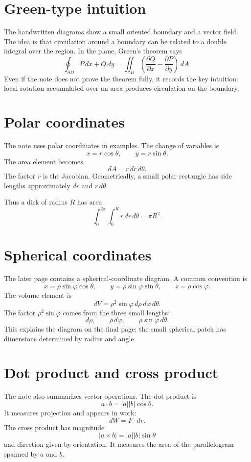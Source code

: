 \section{Green-type intuition}

The handwritten diagrams show a small oriented boundary and a vector field.  The idea is that circulation around a boundary can be related to a double integral over the region.  In the plane, Green's theorem says
\[
  \oint_{\partial D} P\,dx+Q\,dy
  =
  \iint_D \left(\frac{\partial Q}{\partial x}-\frac{\partial P}{\partial y}\right)\,dA.
\]
Even if the note does not prove the theorem fully, it records the key intuition: local rotation accumulated over an area produces circulation on the boundary.

\section{Polar coordinates}

The note uses polar coordinates in examples.  The change of variables is
\[
  x=r\cos\theta,\qquad y=r\sin\theta.
\]
The area element becomes
\[
  dA=r\,dr\,d\theta.
\]
The factor $r$ is the Jacobian.  Geometrically, a small polar rectangle has side lengths approximately $dr$ and $r\,d\theta$.

Thus a disk of radius $R$ has area
\[
  \int_0^{2\pi}\int_0^R r\,dr\,d\theta=\pi R^2.
\]

\section{Spherical coordinates}

The later page contains a spherical-coordinate diagram.  A common convention is
\[
  x=\rho\sin\varphi\cos\theta,\qquad
  y=\rho\sin\varphi\sin\theta,\qquad
  z=\rho\cos\varphi.
\]
The volume element is
\[
  dV=\rho^2\sin\varphi\,d\rho\,d\varphi\,d\theta.
\]
The factor $\rho^2\sin\varphi$ comes from the three small lengths:
\[
  d\rho,\qquad \rho\,d\varphi,\qquad \rho\sin\varphi\,d\theta.
\]
This explains the diagram on the final page: the small spherical patch has dimensions determined by radius and angle.

\section{Dot product and cross product}

The note also summarizes vector operations.  The dot product is
\[
  a\cdot b=|a||b|\cos\theta.
\]
It measures projection and appears in work:
\[
  dW=F\cdot dr.
\]
The cross product has magnitude
\[
  |a\times b|=|a||b|\sin\theta
\]
and direction given by orientation.  It measures the area of the parallelogram spanned by $a$ and $b$.

